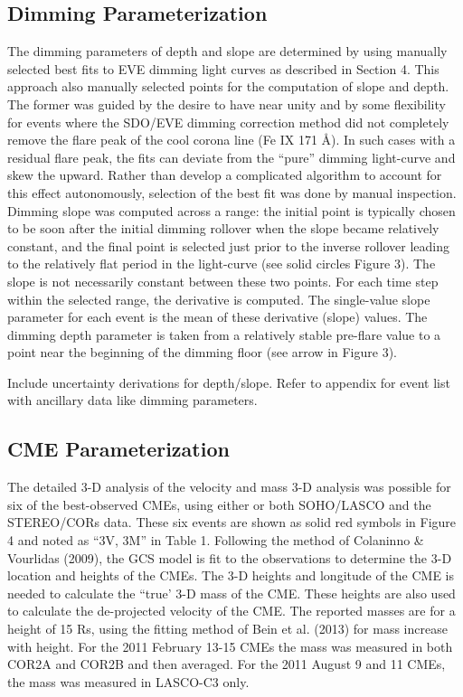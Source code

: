 \subsection{Dimming Parameterization}

The dimming parameters of depth and slope are determined by using manually selected best fits to EVE dimming light curves as described in Section 4. This approach also manually selected points for the computation of slope and depth. The former was guided by the desire to have  near unity and by some flexibility for events where the SDO/EVE dimming correction method did not completely remove the flare peak of the cool corona line (Fe IX 171 Å). In such cases with a residual flare peak, the fits can deviate from the “pure” dimming light-curve and skew the   upward. Rather than develop a complicated algorithm to account for this effect autonomously, selection of the best fit was done by manual inspection. Dimming slope was computed across a range: the initial point is typically chosen to be soon after the initial dimming rollover when the slope became relatively constant, and the final point is selected just prior to the inverse rollover leading to the relatively flat period in the light-curve (see solid circles Figure 3). The slope is not necessarily constant between these two points. For each time step within the selected range, the derivative is computed. The single-value slope parameter for each event is the mean of these derivative (slope) values. The dimming depth parameter is taken from a relatively stable pre-flare value to a point near the beginning of the dimming floor (see arrow in Figure 3). 

Include uncertainty derivations for depth/slope.
Refer to appendix for event list with ancillary data like dimming parameters. 

\subsection{CME Parameterization}
The detailed 3-D analysis of the velocity and mass 3-D analysis was possible for six of the best-observed CMEs, using either or both SOHO/LASCO and the STEREO/CORs data. These six events are shown as solid red symbols in Figure 4 and noted as “3V, 3M” in Table 1. Following the method of Colaninno & Vourlidas (2009), the GCS model is fit to the observations to determine the 3-D location and heights of the CMEs. The 3-D heights and longitude of the CME is needed to calculate the “true’ 3-D mass of the CME. These heights are also used to calculate the de-projected velocity of the CME. The reported masses are for a height of 15 Rs, using the fitting method of Bein et al. (2013) for mass increase with height. For the 2011 February 13-15 CMEs the mass was measured in both COR2A and COR2B and then averaged.  For the 2011 August 9 and 11 CMEs, the mass was measured in LASCO-C3 only.

